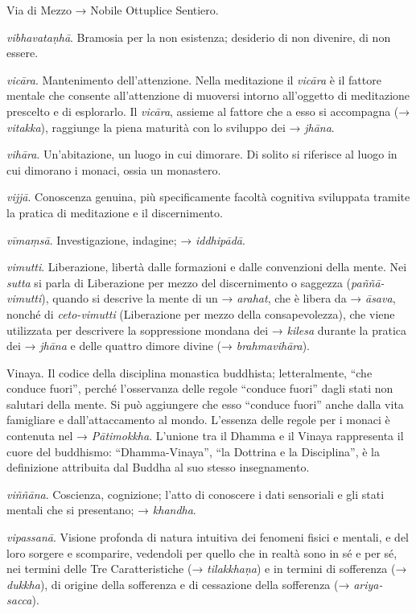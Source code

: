 Via di Mezzo → Nobile Ottuplice Sentiero.

\emph{vibhavataṇhā}. Bramosia per la non esistenza; desiderio di non
divenire, di non essere.

\emph{vicāra}. Mantenimento dell'attenzione. Nella meditazione il
\emph{vicāra} è il fattore mentale che consente all'attenzione di
muoversi intorno all'oggetto di meditazione prescelto e di esplorarlo.
Il \emph{vicāra}, assieme al fattore che a esso si accompagna (→
\emph{vitakka}), raggiunge la piena maturità con lo sviluppo dei →
\emph{jhāna}.

\emph{vihāra}. Un'abitazione, un luogo in cui dimorare. Di solito si
riferisce al luogo in cui dimorano i monaci, ossia un monastero.

\emph{vijjā}. Conoscenza genuina, più specificamente facoltà cognitiva
sviluppata tramite la pratica di meditazione e il discernimento.

\emph{vīmaṃsā}. Investigazione, indagine; → \emph{iddhipādā}.

\emph{vimutti}. Liberazione, libertà dalle formazioni e dalle
convenzioni della mente. Nei \emph{sutta} si parla di Liberazione per
mezzo del discernimento o saggezza (\emph{paññā-vimutti}), quando si
descrive la mente di un → \emph{arahat}, che è libera da → \emph{āsava},
nonché di \emph{ceto-vimutti} (Liberazione per mezzo della
consapevolezza), che viene utilizzata per descrivere la soppressione
mondana dei → \emph{kilesa} durante la pratica dei → \emph{jhāna} e
delle quattro dimore divine (→ \emph{brahmavihāra}).

Vinaya. Il codice della disciplina monastica buddhista; letteralmente,
``che conduce fuori'', perché l'osservanza delle regole ``conduce
fuori'' dagli stati non salutari della mente. Si può aggiungere che esso
``conduce fuori'' anche dalla vita famigliare e dall'attaccamento al
mondo. L'essenza delle regole per i monaci è contenuta nel →
\emph{Pātimokkha}. L'unione tra il Dhamma e il Vinaya rappresenta il
cuore del buddhismo: ``Dhamma-Vinaya'', ``la Dottrina e la Disciplina'',
è la definizione attribuita dal Buddha al suo stesso insegnamento.

\emph{viññāna}. Coscienza, cognizione; l'atto di conoscere i dati
sensoriali e gli stati mentali che si presentano; → \emph{khandha}.

\emph{vipassanā}. Visione profonda di natura intuitiva dei fenomeni
fisici e mentali, e del loro sorgere e scomparire, vedendoli per quello
che in realtà sono in sé e per sé, nei termini delle Tre Caratteristiche
(→ \emph{tilakkhaṇa}) e in termini di sofferenza (→ \emph{dukkha}), di
origine della sofferenza e di cessazione della sofferenza (→
\emph{ariya-sacca}).

